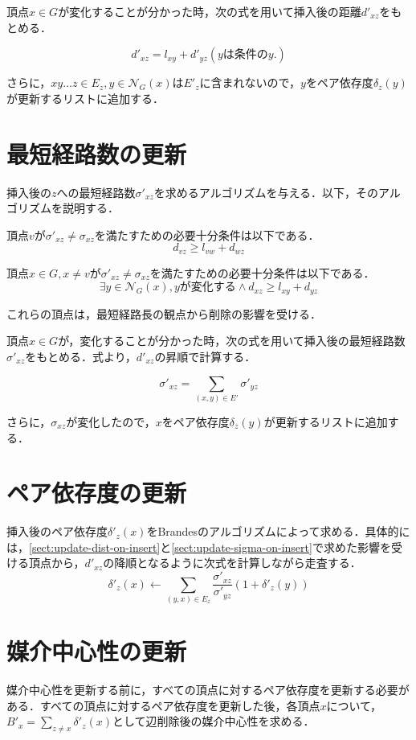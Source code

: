 頂点$x\in G$が変化することが分かった時，次の式を用いて挿入後の距離$d'_{xz}$をもとめる．

\begin{corollary-without-proof}
  \begin{equation*}
    d'_{xz}=l_{xy}+d'_{yz} (y\mathrm{は条件の}y.)
  \end{equation*}
\end{corollary-without-proof}

さらに，$xy\ldots z\in E_z,y\in\mathcal{N}_G(x)$は$E'_z$に含まれないので，$y$をペア依存度$\delta_z(y)$が更新するリストに追加する．

\section{最短経路数の更新}
\label{sect:update-sigma-on-delete}

挿入後の$z$への最短経路数$\sigma'_{xz}$を求めるアルゴリズムを与える．以下，そのアルゴリズムを説明する．

頂点$v$が$\sigma'_{xz}\neq\sigma_{xz}$を満たすための必要十分条件は以下である．
\begin{equation*}
  d_{vz}\geq l_{vw}+d_{wz}
\end{equation*}

頂点$x\in G,x\neq v$が$\sigma'_{xz}\neq\sigma_{xz}$を満たすための必要十分条件は以下である．
\begin{equation*}
  \exists y\in\mathcal{N}_G(x),yが変化する\land d_{xz}\geq l_{xy}+d_{yz}
\end{equation*}

これらの頂点は，最短経路長の観点から削除の影響を受ける．

頂点$x\in G$が，変化することが分かった時，次の式を用いて挿入後の最短経路数$\sigma'_{xz}$をもとめる．式より，$d'_{xz}$の昇順で計算する．

\begin{equation*}
  \sigma'_{xz}=\sum_{(x,y)\in E'}\sigma'_{yz}
\end{equation*}

さらに，$\sigma_{xz}$が変化したので，$x$をペア依存度$\delta_z(y)$が更新するリストに追加する．

\section{ペア依存度の更新}
\label{sect:update-delta-on-delete}

挿入後のペア依存度$\delta'_z(x)$をBrandesのアルゴリズムによって求める．具体的には，\ref{sect:update-dist-on-insert}と\ref{sect:update-sigma-on-insert}で求めた影響を受ける頂点から，$d'_{xz}$の降順となるように次式を計算しながら走査する．
\[ \delta'_{z}(x)\gets\sum_{(y,x)\in E_z}\frac{\sigma'_{xz}}{\sigma'_{yz}}(1+\delta'_z(y)) \]

\section{媒介中心性の更新}
媒介中心性を更新する前に，すべての頂点に対するペア依存度を更新する必要がある．すべての頂点に対するペア依存度を更新した後，各頂点$x$について，$B'_x=\sum_{z\neq x}\delta'_{z}(x)$として辺削除後の媒介中心性を求める．

